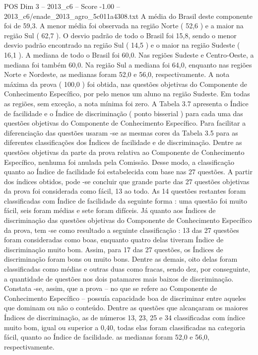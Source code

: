 \begin{textsample}{POS Dim 3 – 2013\_c6 – Score -1.00 – 2013\_c6/enade\_2013\_agro\_5c011a4308.txt}
A média do Brasil deste componente foi de 59,3.
A menor média foi observada na região Norte ( 52,6 ) e a maior na região Sul ( 62,7 ).
O desvio padrão de todo o Brasil foi 15,8, sendo o menor desvio padrão encontrado na região Sul ( 14,5 ) e o maior na região Sudeste ( 16,1 ).
A mediana de todo o Brasil foi 60,0.
Nas regiões Sudeste e Centro-Oeste, a mediana foi também 60,0.
Na região Sul a mediana foi 64,0, enquanto nas regiões Norte e Nordeste, as medianas foram 52,0 e 56,0, respectivamente.
A nota máxima da prova ( 100,0 ) foi obtida, nas questões objetivas do Componente de Conhecimento Específico, por pelo menos um aluno na região Sudeste.
Em todas as regiões, sem exceção, a nota mínima foi zero.
A Tabela 3.7 apresenta o Índice de facilidade e o Índice de discriminação ( ponto bisserial ) para cada uma das questões objetivas do Componente de Conhecimento Específico.
Para facilitar a diferenciação das questões usaram -se as mesmas cores da Tabela 3.5 para as diferentes classificações dos Índices de facilidade e de discriminação.
Dentre as questões objetivas da parte da prova relativa ao Componente de Conhecimento Específico, nenhuma foi anulada pela Comissão.
Desse modo, a classificação quanto ao Índice de facilidade foi estabelecida com base nas 27 questões.
A partir dos índices obtidos, pode -se concluir que grande parte das 27 questões objetivas da prova foi considerada como fácil, 13 ao todo.
As 14 questões restantes foram classificadas com Índice de facilidade da seguinte forma : uma questão foi muito fácil, seis foram médias e sete foram difíceis.
Já quanto aos Índices de discriminação das questões objetivas do Componente de Conhecimento Específico da prova, tem -se como resultado a seguinte classificação : 13 das 27 questões foram consideradas como boas, enquanto quatro delas tiveram Índice de discriminação muito bom.
Assim, para 17 das 27 questões, os Índices de discriminação foram bons ou muito bons.
Dentre as demais, oito delas foram classificadas como médias e outras duas como fracas, sendo dez, por conseguinte, a quantidade de questões nos dois patamares mais baixos de discriminação.
Constata -se, assim, que a prova – no que se refere ao Componente de Conhecimento Específico – possuía capacidade boa de discriminar entre aqueles que dominam ou não o conteúdo.
Dentre as questões que alcançaram os maiores Índices de discriminação, as de números 13, 23, 25 e 34 classificadas com índice muito bom, igual ou superior a 0,40, todas elas foram classificadas na categoria fácil, quanto ao Índice de facilidade. as medianas foram 52,0 e 56,0, respectivamente.

\end{textsample}
